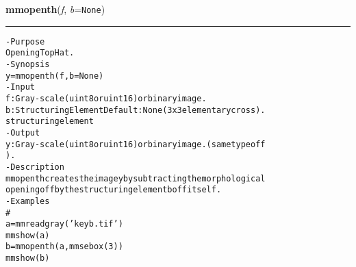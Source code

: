     \label{multireg:num_pymorph:mmopenth}
    \vspace{0.5ex}

    \begin{boxedminipage}{\textwidth}

    \raggedright \textbf{mmopenth}(\textit{f}, \textit{b}=\texttt{N\-o\-n\-e\-})

    \vspace{-1.5ex}

    \rule{\textwidth}{0.5\fboxrule}
\begin{alltt}
- Purpose
    Opening Top Hat.
- Synopsis
    y = mmopenth(f, b=None)
- Input
    f: Gray-scale (uint8 or uint16) or binary image.
    b: Structuring Element Default: None (3x3 elementary cross).
       structuring element
- Output
    y: Gray-scale (uint8 or uint16) or binary image. (same type of f
       ).
- Description
    mmopenth creates the image y by subtracting the morphological
    opening of f by the structuring element b of f itself.
- Examples
    \#
    a = mmreadgray('keyb.tif')
    mmshow(a)
    b = mmopenth(a,mmsebox(3))
    mmshow(b)\end{alltt}

    \vspace{1ex}

    \end{boxedminipage}

    \label{multireg:num_pymorph:mmopentransf}
    \vspace{0.5ex}

